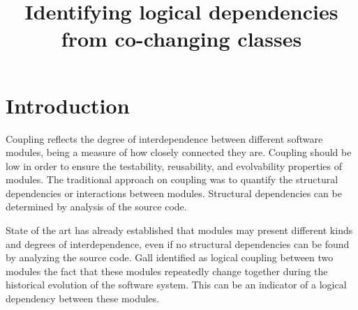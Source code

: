 \documentclass[a4paper,twoside]{article}
\begin{document}
\title{Identifying logical dependencies from co-changing classes}


\author{
}




\onecolumn \maketitle \normalsize \setcounter{footnote}{0} \vfill



\section{Introduction}
\label{sec:intro}

Coupling reflects the degree of interdependence between different software modules, being a measure of how closely connected they are. Coupling should be low in order to ensure the testability, reusability, and evolvability properties of modules.  The traditional approach on coupling was to quantify the structural dependencies or interactions between modules. Structural dependencies can be determined by analysis of the source code.
   
State of the art has already established that modules may present different kinds and degrees of interdependence, even if no structural dependencies can be found by analyzing the source code. Gall \cite{Gall:1998:DLC:850947.853338} identified as logical coupling between two modules the fact that these modules repeatedly change together during the historical evolution of the software system. This can be an indicator of a logical dependency between these modules.
\end{document}
